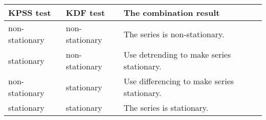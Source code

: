\centering
\begin{tabular}{|l|l|l|}
\hline
KPSS test      & KDF test       & The combination result                      \\ \hline
non-stationary & non-stationary & The series is non-stationary.               \\ \hline
stationary     & non-stationary & Use detrending to make series stationary.   \\ \hline
non-stationary & stationary     & Use differencing to make series stationary. \\ \hline
stationary     & stationary     & The series is stationary.                   \\ \hline
\end{tabular}
